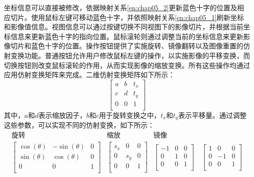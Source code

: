 坐标信息可以直接被修改，依据映射关系\ref{en:chap05_2}更新蓝色十字的位置及相应切片。使用鼠标左键可移动蓝色十字，并依照映射关系\ref{en:chap05_1}刷新坐标和影像值信息。视图信息可以通过按键切换不同视图下的影像切片，并根据当前坐标信息来更新蓝色十字的指向位置。鼠标滚轮则通过调整当前的坐标信息来更新影像切片和蓝色十字的位置。操作按钮提供了实施旋转、镜像翻转以及图像重置的仿射变换功能。普通按钮允许用户修改鼠标左键的操作，以实施影像的平移变换，而切换按钮则改变鼠标滚轮的作用，从而实现影像的缩放变换。所有这些操作均通过应用仿射变换矩阵来完成。二维仿射变换矩阵如下所示：
\begin{equation}
    \left[
        \begin{array}{ccc}
            a & b & t_x \\
            c & d & t_y \\
            0 & 0 & 1   \\
        \end{array}
        \right]
    \label{eq:chap05_affine_mat}
\end{equation}
其中，\(a\)和\(d\)表示缩放因子，\(b\)和\(c\)用于旋转变换之中，\(t_x\)和\(t_y\)表示平移量。通过调整这些参数，可以实现不同的仿射变换，如下所示：
\begin{equation}
    \begin{array}{ccc}
        \text{旋转} & \text{缩放} & \text{镜像} \\
        \left[
            \begin{array}{ccc}
                \cos(\theta) & -\sin(\theta) & 0 \\
                \sin(\theta) & \cos(\theta)  & 0 \\
                0            & 0             & 1 \\
            \end{array}
        \right]     &
        \left[
            \begin{array}{ccc}
                s_x & 0   & 0 \\
                0   & s_y & 0 \\
                0   & 0   & 1 \\
            \end{array}
        \right]     &
        \left[
            \begin{array}{ccc}
                -1 & 0 & 0 \\
                0  & 1 & 0 \\
                0  & 0 & 1 \\
            \end{array}
            \right] \quad
        \left[
            \begin{array}{ccc}
                1 & 0  & 0 \\
                0 & -1 & 0 \\
                0 & 0  & 1 \\
            \end{array}
        \right]                                 \\
    \end{array}
    \label{eq:chap05_affine}
\end{equation}
